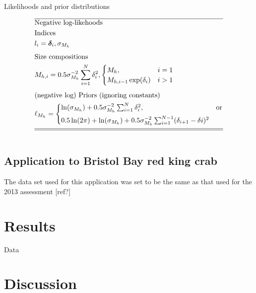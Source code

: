 \documentclass[12pt,letterpaper]{article}
\newcounter{saveEq}
\def\putEq{\setcounter{saveEq}{\value{equation}}}
\def\getEq{\setcounter{equation}{\value{saveEq}}}
\def\tableEq{ %
    \putEq \setcounter{equation}{0}
    \renewcommand{\theequation}{T\arabic{table}.\arabic{equation}}
    \vspace{-5mm}
    }
\def\normalEq{ %
    \getEq
    \renewcommand{\theequation}{\arabic{section}.\arabic{equation}}}
\begin{document}
\begin{table}
      \centering
      \caption{Likelihoods and prior distributions}
      \label{tab:likelihoods}
      \tableEq
      \begin{align}
      \hline \nonumber
      &\mbox{Negative log-likehoods} \nonumber \\
      &\mbox{Indices} \nonumber \\
      & l_i =  \bm{\delta}_i, \sigma_{M_h}  \label{T5.1} \\[1ex]
      &\mbox{Size compositions} \nonumber \\
      & M_{h,i} =0.5 \sigma_{M_h}^{-2} \sum_{i=1}^{N} \delta_{i}^2, 
      \begin{cases}
        M_h, &i=1\\
        M_{h,i-1} \exp(\delta_i) &i>1
      \end{cases} \label{T5.2} \\[1ex]
      &\mbox{(negative log) Priors (ignoring constants)} \nonumber \\
      &\ell_{M_h} = 
      \begin{cases}
      \ln(\sigma_{M_h}) 
      + 0.5 \sigma_{M_h}^{-2} \sum_{i=1}^{N} \delta_{i}^2, & \mbox{or}  \\[1ex]
      0.5 \ln(2 \pi) + \ln(\sigma_{M_h}) 
      + 0.5 \sigma_{M_h}^{-2}\sum_{i=1}^{N-1}(\delta_{i+1} - \delta{i})^{2}  \\
      \end{cases}\label{T5.3}\\[1ex]
      \hline \hline \nonumber
      \end{align}
      \normalEq
    \end{table}






%
%
  \subsection*{Application to Bristol Bay red king crab} %
  The data set used for this application was set to be the same as that used for the 2013 assessment [ref?]
  
  
  \section*{Results} %
  Data 
  
  \section*{Discussion} %
  


  
  
\end{document}
